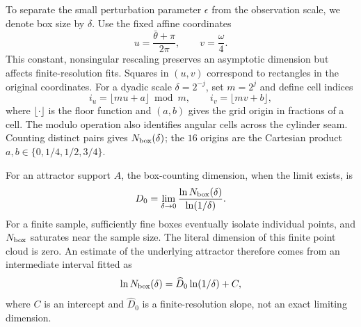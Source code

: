 \documentclass[aps,prb,reprint,floatfix]{revtex4-2}
\begin{document}
To separate the small perturbation parameter $\epsilon$ from the observation scale, we denote box size by $\delta$. Use the fixed affine coordinates
\begin{equation}
 u=\frac{\bar\theta+\pi}{2\pi},\qquad v=\frac{\omega}{4}.
\label{eq:box_coordinates}
\end{equation}
This constant, nonsingular rescaling preserves an asymptotic dimension but affects finite-resolution fits. Squares in $(u,v)$ correspond to rectangles in the original coordinates. For a dyadic scale $\delta=2^{-j}$, set $m=2^j$ and define cell indices
\begin{equation}
i_u=\lfloor mu+a\rfloor\bmod m,\qquad
i_v=\lfloor mv+b\rfloor,
\label{eq:periodic_cells}
\end{equation}
where $\lfloor\cdot\rfloor$ is the floor function and $(a,b)$ gives the grid origin in fractions of a cell. The modulo operation also identifies angular cells across the cylinder seam. Counting distinct pairs gives $N_{\rm box}(\delta)$; the $16$ origins are the Cartesian product $a,b\in\{0,1/4,1/2,3/4\}$.

For an attractor support $A$, the box-counting dimension, when the limit exists, is
\begin{equation}
 D_0=\lim_{\delta\to0}\frac{\ln N_{\rm box}(\delta)}{\ln(1/\delta)}.
\label{eq:box_dimension}
\end{equation}
For a finite sample, sufficiently fine boxes eventually isolate individual points, and $N_{\rm box}$ saturates near the sample size. The literal dimension of this finite point cloud is zero. An estimate of the underlying attractor therefore comes from an intermediate interval fitted as
\begin{equation}
\ln N_{\rm box}(\delta)=\widehat D_0\ln(1/\delta)+C,
\label{eq:box_linear}
\end{equation}
where $C$ is an intercept and $\widehat D_0$ is a finite-resolution slope, not an exact limiting dimension.\cite{Theiler1990}
\end{document}
